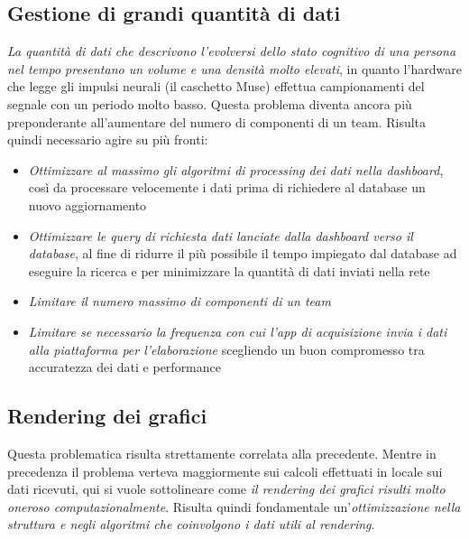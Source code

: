 \subsection{Gestione di grandi quantità di dati}
\emph{La quantità di dati che descrivono l'evolversi dello stato cognitivo di una persona nel tempo presentano un volume e una densità molto elevati}, in quanto l'hardware che legge gli impulsi neurali (il caschetto Muse) effettua campionamenti del segnale con un periodo molto basso.\newline
Questa problema diventa ancora più preponderante all'aumentare del numero di componenti di un team.\newline
Risulta quindi necessario agire su più fronti:
\begin{itemize}
  \item
  {\emph{Ottimizzare al massimo gli algoritmi di processing dei dati nella dashboard}, così da processare velocemente i dati prima di richiedere al database un nuovo aggiornamento}
  \item
  {\emph{Ottimizzare le query di richiesta dati lanciate dalla dashboard verso il database}, al fine di ridurre il più possibile il tempo impiegato dal database ad eseguire la ricerca e per minimizzare la quantità di dati inviati nella rete}
  \item
  {\emph{Limitare il numero massimo di componenti di un team}}
  \item
  {\emph{Limitare se necessario la frequenza con cui l'app di acquisizione invia i dati alla piattaforma per l'elaborazione} scegliendo un buon compromesso tra accuratezza dei dati e performance}
\end{itemize}
\subsection{Rendering dei grafici}
Questa problematica risulta strettamente correlata alla precedente.\newline 
Mentre in precedenza il problema verteva maggiormente sui calcoli effettuati in locale sui dati ricevuti, qui si vuole sottolineare come \emph{il rendering dei grafici risulti molto oneroso computazionalmente}.\newline
Risulta quindi fondamentale un'\emph{ottimizzazione nella struttura e negli algoritmi che coinvolgono i dati utili al rendering}.
